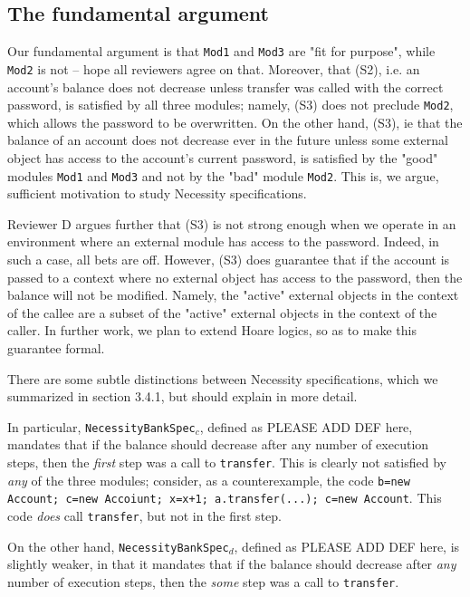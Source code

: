 \documentclass[11pt]{amsart}
\newcommand{\prg}[1]{\texttt{#1}}
\begin{document}
\subsection*{The fundamental argument}

Our fundamental argument is that \prg{Mod1} and \prg{Mod3} are "fit for purpose", while \prg{Mod2} is not -- hope all reviewers agree on that.
Moreover, that (S2), i.e. an account's balance does not decrease unless transfer was called with the correct password, is satisfied by all three modules; namely, (S3) does not preclude \prg{Mod2}, which allows the password to be overwritten. On the other hand, (S3), ie that the balance of an account does not decrease ever in the future unless some external object has access to the account's current password, is satisfied by the "good" modules \prg{Mod1} and \prg{Mod3} and not by the "bad" module \prg{Mod2}. This is, we argue, sufficient motivation to study Necessity specifications. 

Reviewer D argues further that (S3) is not strong enough when we operate in an environment where an external module has access to the password. Indeed, in such a case, all bets are off. However, (S3) does guarantee that if the account is passed to a context where no external object has access to the password, then the balance will not be modified. Namely, the "active" external objects  in the context of the callee are a subset of the "active" external objects  in the context of the caller.  In further work, we plan to extend Hoare logics, so as to make this guarantee formal.

There are some subtle distinctions between Necessity specifications, which we summarized in section 3.4.1, but should explain in more detail. 

In particular, \prg{NecessityBankSpec}$_c$, defined as PLEASE ADD DEF here, mandates that if the balance should decrease after any number of execution steps, then the \emph{first} step was a call  to \prg{transfer}. This is clearly not satisfied by \emph{any} of the three modules; consider, as a counterexample, the code \prg{b=new Account; c=new Accoiunt; x=x+1; a.transfer(...); c=new Account}. This code \emph{does} call \prg{transfer}, but not in the first step.

On the other hand,   \prg{NecessityBankSpec}$_d$, defined as PLEASE ADD DEF here, is slightly weaker, in that it mandates that if the balance should decrease after \emph{any} number of execution steps, then the \emph{some} step was a call  to \prg{transfer}.  
\end{document}
